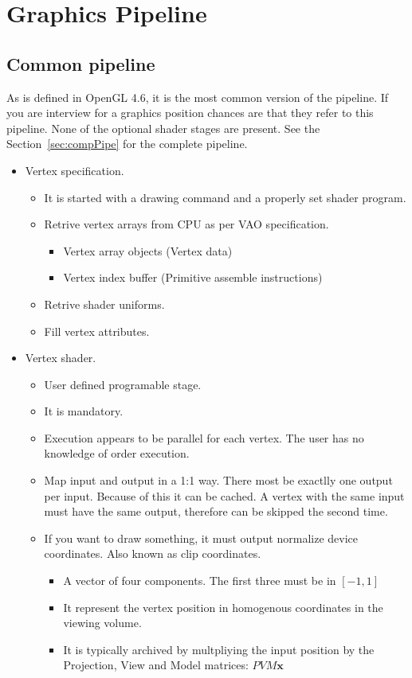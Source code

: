 \section{Graphics Pipeline}

\subsection{Common pipeline}
\label{sec:commPipe}

As is defined in OpenGL 4.6, it is the most common version of the pipeline.  If you are interview for a graphics position chances are that they refer to this pipeline. None of the  optional shader stages are present. See the Section~\ref{sec:compPipe} for the complete pipeline.

\begin{itemize}
 \item Vertex specification.
 \begin{itemize}
  \item It is started with a drawing command and a properly set shader program.
  \item Retrive vertex arrays from CPU as per VAO specification.
  \begin{itemize}
   \item Vertex array objects (Vertex data)
   \item Vertex index buffer (Primitive assemble instructions)
  \end{itemize}
  \item Retrive shader uniforms.
  \item Fill vertex attributes.
 \end{itemize}

 \item Vertex shader.
 \begin{itemize}
  \item User defined programable stage.
  \item It is mandatory.
  \item Execution appears to be parallel for each vertex. The user has no knowledge of order execution.
  \item Map input and output in a 1:1 way. There most be exactlly one output per input. Because of this it can be cached. A vertex with the same input must have the same output, therefore can be skipped the second time.
  \item If you want to draw something, it must output normalize device coordinates. Also known as clip coordinates. 
  \begin{itemize}
   \item A vector of four components. The first three must be in $[-1, 1]$
   \item It represent the vertex position in homogenous coordinates in the viewing volume.
   \item It is typically archived by multpliying the input position by the Projection, View and Model matrices: $P V M\mathbf{x}$
  \end{itemize}


\end{itemize}
\end{itemize}
